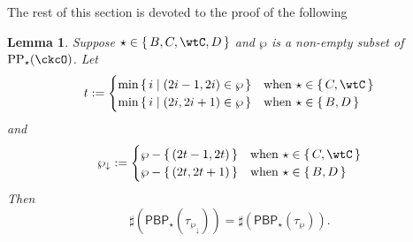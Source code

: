 \documentclass[12pt,a4paper]{amsart}
\numberwithin{equation}{section}
\newtheorem{lem}[thm]{Lemma}
\theoremstyle{remark}
\def\CPPs{\mathrm{PP}_{\star}}
\def\PBP{\mathsf{PBP}}
\begin{document}
The rest of this section is devoted to the proof of the following


\def\PPm{\wp_{\downarrow}}
\def\uptaum{\uptau_{\downarrow}}


\begin{lem}\label{lem:down}
  Suppose $\star \in \set{B, C, \wtC, D}$ and
  $\wp$ is a non-empty subset of $\CPPs(\ckcO)$.
  Let
  \[
    t:=
    \begin{cases}
      \min\set{i|(2i-1,2i)\in \wp} & \text{when $\star \in \set{C,\wtC}$}\\
      \min\set{i|(2i,2i+1)\in \wp} & \text{when $\star \in \set{B,D}$}\\
    \end{cases}
  \]
  and
  \[
    \PPm:=
    \begin{cases}
      \wp - \set{(2t-1,2t)}  & \text{when $\star \in \set{C,\wtC}$}\\
      \wp -  \set{(2t,2t+1)} & \text{when $\star \in \set{B,D}$}\\
    \end{cases}
  \]
  Then
  \[
    \sharp(\PBP_{\star}(\tau_{\PPm})) = \sharp(\PBP_{\star}(\tau_{\wp})).
  \]
\end{lem}
\end{document}
